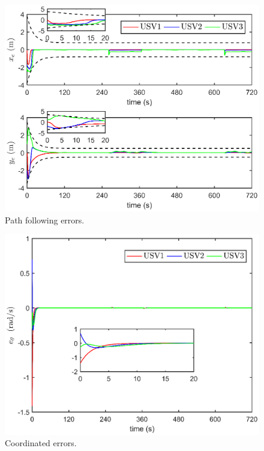 \documentclass[conference,letterpaper,10.5pt]{IEEEtran}
\begin{document}
\begin{figure}[!htb]
	\centering
	\includegraphics[width=\hsize]{path_following_errors.eps}
	\caption{Path following errors.}
	\label{path following errors}
\end{figure}

\begin{figure}[!htb]
	\centering
	\includegraphics[width=\hsize]{coordinated_errors.eps}
	\caption{Coordinated errors.}
	\label{coordinated errors}
\end{figure}
\end{document}
